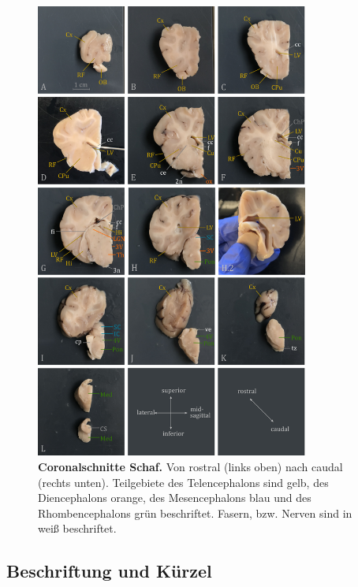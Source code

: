 \documentclass[12pt,a4paper,pdftex]{article}
\begin{document}
\begin{figure}[H]
\centering
\includegraphics[width=0.8\textwidth]{pictures/Bilder_Jule/Schaf/coronal/coronal_schaf_all.png}
\caption[Coronalschnitte Schaf]{\textbf{Coronalschnitte Schaf.} Von rostral (links oben) nach caudal (rechts unten). Teilgebiete des Telencephalons sind gelb, des Diencephalons orange, des Mesencephalons blau und des Rhombencephalons grün beschriftet. Fasern, bzw. Nerven sind in weiß beschriftet.}
\label{fig:coronal_schaf}
\end{figure}

\subsection{Beschriftung und Kürzel}
\end{document}

